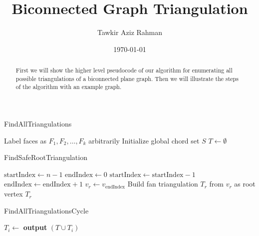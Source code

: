 \documentclass{beamer}
\title{Biconnected Graph Triangulation}
\author{Tawkir Aziz Rahman}
\date{\today}
\begin{document}
\frame{\titlepage}

\begin{frame}
	\begin{abstract}
		First we will show the higher level pseudocode of our algorithm for enumerating all possible triangulations of a biconnected plane graph. Then we will illustrate the steps of the algorithm with an example graph.
	\end{abstract}
\end{frame}

\begin{frame}[fragile]{FindAllTriangulations}
	\begin{algorithm}[H]
		\caption{FindAllTriangulations}
		\begin{algorithmic}[1]
			\State Label faces as $F_1, F_2, \ldots, F_k$ arbitrarily
			\State Initialize global chord set $S$
			\State $T \gets \emptyset$ 
			\State {}
			\EndProcedure
		\end{algorithmic}
	\end{algorithm}
\end{frame}

\begin{frame}[fragile]{FindSafeRootTriangulation}
	\begin{algorithm}[H]
		\caption{FindSafeRootTriangulation}
		\begin{algorithmic}[1]
			\State $\text{startIndex} \gets n - 1$
			\State $\text{endIndex} \gets 0$
			\State $\text{startIndex} \gets \text{startIndex} - 1$
			\Else
			\State $\text{endIndex} \gets \text{endIndex} + 1$
			\EndIf
			\EndWhile
			\State $v_r \gets v_{\text{endIndex}}$ 
			\State Build fan triangulation $T_r$ from $v_r$ as root vertex
			\State \Return $T_r$
			\EndProcedure
		\end{algorithmic}
	\end{algorithm}
\end{frame}

\begin{frame}[fragile]{FindAllTriangulationsCycle}
	\begin{algorithm}[H]
		\caption{FindAllTriangulationsCycle}
		\begin{algorithmic}[1]
			\State $T_{i} \gets$  
			 
			\State \textbf{output} $(T \cup T_i)$
			\Else
			\State {}
			\EndIf
			\State {}
			\EndFor
			\EndProcedure
		\end{algorithmic}
	\end{algorithm}
\end{frame}
\end{document}
